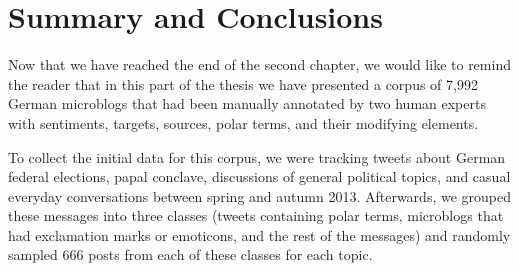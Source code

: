 

\section{Summary and Conclusions}

Now that we have reached the end of the second chapter, we would like
to remind the reader that in this part of the thesis we have presented
a corpus of 7,992 German microblogs that had been manually annotated
by two human experts with sentiments, targets, sources, polar terms,
and their modifying elements.

To collect the initial data for this corpus, we were tracking tweets
about German federal elections, papal conclave, discussions of general
political topics, and casual everyday conversations between spring and
autumn 2013.  Afterwards, we grouped these messages into three classes
(tweets containing polar terms, microblogs that had exclamation marks
or emoticons, and the rest of the messages) and randomly sampled 666
posts from each of these classes for each topic.


